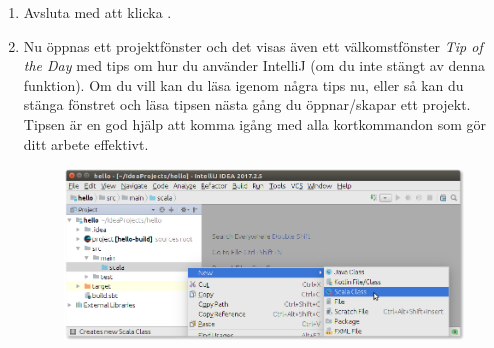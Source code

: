 \begin{enumerate}
\begin{figure}[h]
\end{figure}

\item Avsluta med att klicka .

\item Nu öppnas ett projektfönster och det visas även ett välkomstfönster \textit{Tip of the Day} med tips om hur du använder IntelliJ (om du inte stängt av denna funktion). Om du vill kan du läsa igenom några tips nu, eller så kan du stänga fönstret och läsa tipsen nästa gång du öppnar/skapar ett projekt. Tipsen är en god hjälp att komma igång med alla kortkommandon som gör ditt arbete effektivt. %

%
%



\begin{figure}
\centering
\includegraphics[width=1.0\textwidth]{../img/intellij/idea-new-scala-class.png}


\end{figure}
\end{enumerate}

